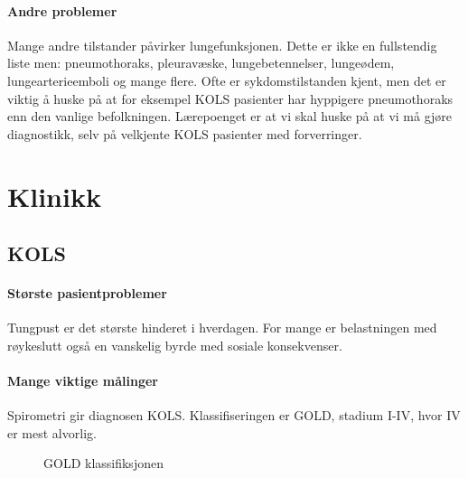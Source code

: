             \paragraph{Andre problemer\\}
            	Mange andre tilstander påvirker lungefunksjonen. Dette er ikke en fullstendig liste men: pneumothoraks, pleuravæske, lungebetennelser, lungeødem, lungearterieemboli og mange flere. Ofte er sykdomstilstanden kjent, men det er viktig å huske på at for eksempel KOLS pasienter har hyppigere pneumothoraks enn den vanlige befolkningen. Lærepoenget er at vi skal huske på at vi må gjøre diagnostikk, selv på velkjente KOLS pasienter med forverringer. 
		\section{Klinikk}
			\subsection{KOLS}
				\paragraph{Største pasientproblemer\\}
					Tungpust er det største hinderet i hverdagen. For mange er belastningen med røykeslutt også en vanskelig byrde med sosiale konsekvenser. 
				\paragraph{Mange viktige målinger\\}
					Spirometri gir diagnosen KOLS. Klassifiseringen er GOLD, stadium I-IV, hvor IV er mest alvorlig.
						\begin{figure}[ht]
                      \centering
                      \caption{GOLD klassifiksjonen}
                    \end{figure}
